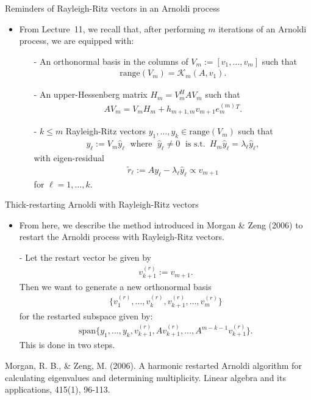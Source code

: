\documentclass[t,usepdftitle=false]{beamer}
\begin{document}
\begin{frame}{Reminders of Rayleigh-Ritz vectors in an Arnoldi process}
\begin{itemize}
\item From Lecture~11, we recall that, after performing $m$ iterations of an Arnoldi process, we are equipped with:
\begin{itemize}\normalsize
\item[-] An orthonormal basis in the columns of $V_m:=[v_1,\dots,v_m]$ such that 
\begin{align*}
\text{range}(V_m)=\mathcal{K}_m(A,v_1).
\end{align*}
\item[-] An upper-Hessenberg matrix $H_m=V_m^HAV_m$ such that
\begin{align*}
AV_m=V_mH_m
+h_{m+1,m}v_{m+1}e_m^{(m)}{}^T.
\end{align*}
\item[-] $k\leq m$ Rayleigh-Ritz vectors $y_1,\dots,y_k\in\text{range}(V_m)$ such that
\begin{align*}
y_\ell:=V_m\hat{y}_\ell
\;\text{ where }\;
\hat{y}_\ell\neq 0
\;\text{ is s.t. }\,
H_m\hat{y}_\ell=\lambda_\ell\hat{y}_\ell,
\end{align*}
with eigen-residual
\begin{align*}
\tilde{r}_\ell
:=
Ay_\ell-\lambda_\ell\hat{y}_\ell
\propto
v_{m+1}
\end{align*}
for $\ell=1,\dots,k$.
\end{itemize}
\end{itemize}
\end{frame}

\begin{frame}{Thick-restarting Arnoldi with Rayleigh-Ritz vectors}
\begin{itemize}
\item From here, we describe the method introduced in Morgan \& Zeng (2006) to restart the Arnoldi process with Rayleigh-Ritz vectors.
\item[-] Let the restart vector be given by
\begin{align*}
v_{k+1}^{(r)}:=v_{m+1}.
\end{align*}
Then we want to generate a new orthonormal basis 
\begin{align*}
\{
v_1^{(r)},\dots,v_k^{(r)},
v_{k+1}^{(r)},\dots,v_m^{(r)}
\}
\end{align*}
for the restarted subspace given by:
\begin{align*}
\text{span}\{y_1,\dots,y_k,v_{k+1}^{(r)},Av_{k+1}^{(r)},\dots,A^{m-k-1}v_{k+1}^{(r)}\}.
\end{align*}
This is done in two steps.
\end{itemize}\smallskip
\tiny{Morgan, R. B., \& Zeng, M. (2006). A harmonic restarted Arnoldi algorithm for calculating eigenvalues and determining
multiplicity. Linear algebra and its applications, 415(1), 96-113.}
\end{frame}
\end{document}

